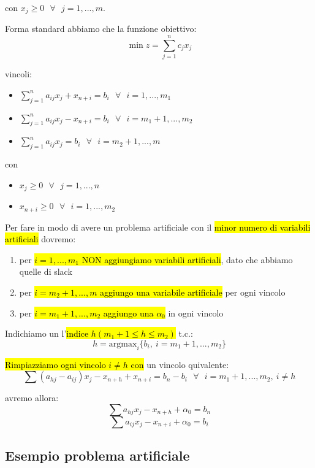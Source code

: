 con $x_j \geq 0\ \ \ \forall\ \ \ j = 1, ..., m$.

Forma standard abbiamo che la funzione obiettivo:
$$\min z = \sum_{j = 1}^n c_jx_j$$

vincoli:

\begin{itemize}
	\item $\sum_{j=1}^n a_{ij}x_j + x_{n+i} = b_i\ \ \ \forall\ \ \ i = 1, ..., m_1$
	\item $\sum_{j=1}^n a_{ij}x_j - x_{n+i} = b_i\ \ \ \forall\ \ \ i = m_1+1, ..., m_2$
	\item $\sum_{j=1}^n a_{ij}x_j = b_i\ \ \ \forall\ \ \ i = m_2+1, ..., m$
\end{itemize}

con 

\begin{itemize}
	\item $x_j \geq 0\ \ \ \forall\ \ \ j = 1, ..., n$
	\item $x_{n+i} \geq 0\ \ \ \forall\ \ \ i = 1, ..., m_2$
\end{itemize}

Per fare in modo di avere un problema artificiale con il \hl{minor numero di variabili artificiali} dovremo:

\begin{enumerate}
	\item per \hl{$i = 1, ..., m_1$ NON aggiungiamo variabili artificiali}, dato che abbiamo quelle di slack
	\item per \hl{$i = m_2 + 1, ..., m$ aggiungo una variabile artificiale} per ogni vincolo
	\item per \hl{$i = m_1 + 1, ..., m_2$ aggiungo una $\alpha_0$} in ogni vincolo
\end{enumerate}

Indichiamo un l'\hl{indice $h(m_1+1 \leq h \leq m_2)$} t.c.:
$$h = \text{argmax}_i\{b_i,\ i = m_1+1, ..., m_2\}$$

\hl{Rimpiazziamo ogni vincolo $i \neq h$ con} un vincolo quivalente:
$$\sum (a_{hj} - a_{ij})x_j - x_{n+h} + x_{n+i} = b_n - b_i\ \ \ \forall\ \ \ i = m_1 + 1, ..., m_2,\ i \neq h$$

avremo allora:
$$\sum a_{hj}x_j - x_{n+h} + \alpha_0 = b_n$$
$$\sum a_{ij}x_j - x_{n+i} + \alpha_0 = b_i$$


\subsection{Esempio problema artificiale}

